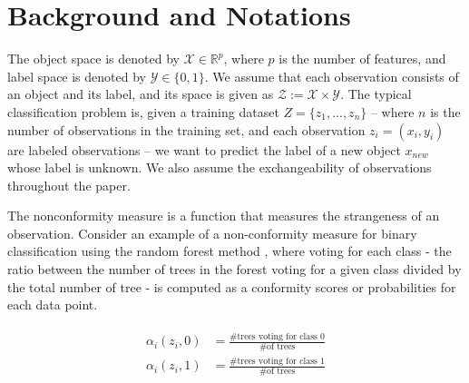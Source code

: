 \documentclass[main]{subfiles}
\begin{document}
\section{Background and Notations}

The object space is denoted by $\mathcal{X} \in \mathbb{R}^p$, where $p$ is the number of features, and  label space is denoted by $\mathcal{Y} \in \{ 0,1 \}$. We assume that each observation consists of an object and its label, and its space is given as $\mathcal{Z} := \mathcal{X} \times \mathcal{Y}$. %
The typical classification problem is, given a training dataset $Z = \{ z_1 , ..., z_n \} $ -- where $n$ is the number of observations in the training set, and each observation $z_i = (x_i, y_i)$ are labeled observations -- we want to predict the label of a new object $x_{new}$ whose label is unknown. We also assume the exchangeability of observations throughout the paper.


The nonconformity measure is a function that measures the strangeness of an observation. Consider an example of a non-conformity measure for binary classification
using the random forest method \citep{Breiman}, where voting for each class - 
the ratio between the number of trees in the forest voting for a given class divided by
the total number of tree - is computed as a 
conformity scores or probabilities for each data point. 

\begin{align} \label{eq:def_nonconformity}
\begin{split}
\alpha_i(z_i, 0) &= \frac{\#\text{trees voting for class 0}}{\#\text{of trees}}\\
\alpha_i(z_i, 1) &= \frac{\#\text{trees voting for class 1}}{\#\text{of trees}}
\end{split}
\end{align}
\end{document}
